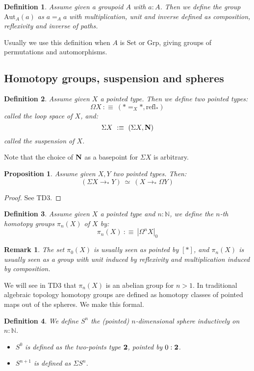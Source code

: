 \documentclass{article}
\newcommand{\sse}[1]{\medbreak \subsection{#1}}
\renewcommand{\r}{\rightarrow}
\newcommand{\refl}{\mathrm{refl}}
\newcommand{\N}{\mathrm{\bf N}}
\newcommand{\Grp}{\mathrm{Grp}}
\newcommand{\Aut}{\mathrm{Aut}}
\newcommand{\two}{{\bf 2}}
\newcommand{\Set}{\mathrm{Set}}
\newtheorem{definition}{Definition}
\newtheorem{proposition}{Proposition}
\newtheorem{remark}{Remark}
\begin{document}
\begin{definition}
Assume given a groupoid $A$ with $a:A$. Then we define the group $\Aut_A(a)$ as $a=_Aa$ with multiplication, unit and inverse defined as composition, reflexivity and inverse of paths.
\end{definition}

Usually we use this definition when $A$ is $\Set$ or $\Grp$, giving groups of permutations and automorphisms.



\sse{Homotopy groups, suspension and spheres}

\begin{definition}
Assume given $X$ a pointed type. Then we define two pointed types:
\[\Omega X \ :\equiv\ (*=_X* , \refl_*)\]
called the loop space of $X$, and:
\[\Sigma X \ :\equiv\ (\Sigma X , \N)\]
called the suspension of $X$.
\end{definition}

Note that the choice of $\N$ as a basepoint for $\Sigma X$ is arbitrary.

\begin{proposition}
Assume given $X,Y$ two pointed types. Then:
\[(\Sigma X \r_* Y)\ \simeq\ (X\r_*\Omega Y)\]
\end{proposition}
\begin{proof}
See TD3.
\end{proof}

\begin{definition}
Assume given $X$ a pointed type and $n:\mathbb{N}$, we define the $n$-th \emph{homotopy groups} $\pi_n(X)$ of $X$ by:
\[\pi_n(X) \ :\equiv\ |\Omega^n X|_0\]
\end{definition}

\begin{remark}
The set $\pi_0(X)$ is usually seen as pointed by $[*]$, and $\pi_n(X)$ is usually seen as a group with unit induced by reflexivity and multiplication induced by composition.
\end{remark}

We will see in TD3 that $\pi_n(X)$ is an abelian group for $n>1$. In traditional algebraic topology homotopy groups are defined as homotopy classes of pointed maps out of the spheres. We make this formal.

\begin{definition}
We define $S^n$ the (pointed) $n$-dimensional sphere inductively on $n:\mathbb{N}$. 
\begin{itemize}
\item $S^0$ is defined as the two-points type $\two$, pointed by $0:\two$.
\item $S^{n+1}$ is defined as $\Sigma S^n$.
\end{itemize}
\end{definition}
\end{document}
